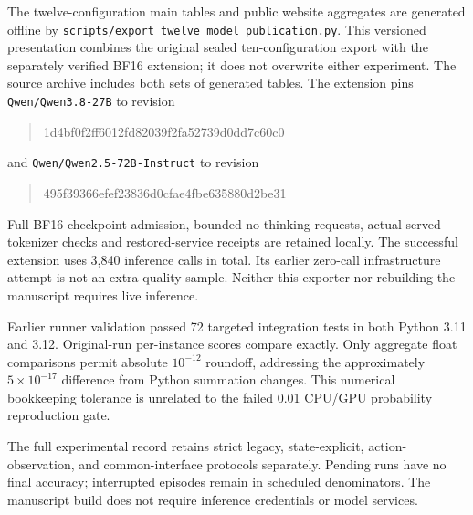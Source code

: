 \documentclass[11pt]{article}
\begin{document}
The twelve-configuration main tables and public website aggregates are
generated offline by
\texttt{scripts/export\_twelve\_model\_publication.py}.
This versioned presentation combines the original sealed ten-configuration
export with the separately verified BF16 extension; it does not overwrite
either experiment. The source archive includes both sets of generated tables.
The extension pins \texttt{Qwen/Qwen3.8-27B} to revision
\begin{quote}\footnotesize\ttfamily
1d4bf0f2ff6012fd82039f2fa52739d0dd7c60c0
\end{quote}
and \texttt{Qwen/Qwen2.5-72B-Instruct} to revision
\begin{quote}\footnotesize\ttfamily
495f39366efef23836d0cfae4fbe635880d2be31
\end{quote}
Full BF16 checkpoint admission, bounded no-thinking requests, actual
served-tokenizer checks and restored-service receipts are retained locally.
The successful extension uses 3,840 inference calls in total. Its earlier
zero-call infrastructure attempt is not an extra quality sample.
Neither this exporter nor rebuilding the manuscript requires live inference.

Earlier runner validation passed 72 targeted integration tests in both
Python 3.11 and 3.12. Original-run per-instance scores compare exactly. Only aggregate
float comparisons permit absolute $10^{-12}$ roundoff, addressing the
approximately $5\times10^{-17}$ difference from Python summation changes.
This numerical bookkeeping tolerance is unrelated to the failed 0.01
CPU/GPU probability reproduction gate.

The full experimental record retains strict legacy, state-explicit,
action-observation, and common-interface protocols separately. Pending runs
have no final accuracy; interrupted episodes remain in scheduled denominators.
The manuscript build does not require inference credentials or model services.
\end{document}
